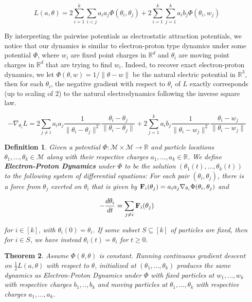 \documentclass[11pt]{article}
\newtheorem{theorem}{Theorem}[section]
\newtheorem{definition}[theorem]{Definition}
\newcommand{\R}{{\mathbb{R}}}
\begin{document}
\begin{equation}\label{errSimp}
L(a,\theta) =  2\sum_{i=1}^k\sum_{i < j} a_ia_j\Phi(\theta_i,\theta_j) + 2\sum_{i=1}^k\sum_{j=1}^ka_ib_j \Phi(\theta_i,w_j)
\end{equation}

By interpreting the pairwise potentials as electrostatic attraction potentials, we notice that our dynamics is similar to electron-proton type dynamics under some potential $\Phi$, where $w_i$ are fixed point charges in $\R^d$ and $\theta_i$ are moving point charges in $\R^d$ that are trying to find $w_i$. Indeed, to recover exact electron-proton dynamics, we let $\Phi(\theta, w) = 1/\|\theta - w \|$ be the natural electric potential in $\R^3$, then for each $\theta_i$, the negative gradient with respect to $\theta_i$ of $L$ exactly corresponds (up to scaling of 2) to the natural electrodynamics following the inverse square law.

\begin{equation}
-\nabla_{\theta_i}{L} =  2\sum_{ j \neq i} a_ia_j \frac{1}{\|\theta_i -\theta_j\|^{2}} \frac{\theta_i -\theta_j}{\|\theta_i -\theta_j\|} + 2\sum_{j=1}^k  a_ib_j\frac{1}{\|\theta_i -w_j\|^{2}} \frac{\theta_i -w_j}{\|\theta_i -w_j\|}
\end{equation}

\begin{definition}\label{EPDef}
Given a potential $\Phi : \mathcal{M} \times \mathcal{M} \to \R$ and particle locations $\theta_1,...,\theta_k \in \mathcal{M}$ along with their respective charges $a_1,...,a_k \in \R$. We define {\bf Electron-Proton Dynamics} under $\Phi$ to be the solution $(\theta_1(t),...,\theta_k(t))$ to the following system of differential equations: For each pair $(\theta_i,\theta_j)$, there is a force from $\theta_j$ exerted on $\theta_i$ that is given by ${\bf F}_{i}(\theta_j) = a_ia_j\nabla_{\theta_i} \Phi(\theta_i,\theta_j)$ and

\begin{equation}
-\frac{d\theta_i}{dt} =  \sum_{ j \neq i} {\bf F}_{i}(\theta_j) \end{equation}
 
for $i \in [k]$, with $\theta_i(0) = \theta_i$. If some subset $S \subseteq [k]$ of particles are fixed, then for $i\in S$, we have instead $\theta_i(t) = \theta_i$ for $t \geq 0$.

\end{definition}


\begin{theorem}\label{EPDyn}
Assume $\Phi(\theta, \theta)$ is constant. Running continuous gradient descent on $\frac{1}{2}L(a,\theta)$ with respect to $\theta$, initialized at $(\theta_1,...,\theta_k)$ produces the same dynamics as Electron-Proton Dynamics under $\Phi$ with fixed particles at $w_1,...,w_k$ with respective charges $b_1,..,b_k$ and moving particles at $\theta_1,...,\theta_k$ with respective charges $a_1,...,a_k$.
\end{theorem}
\end{document}
